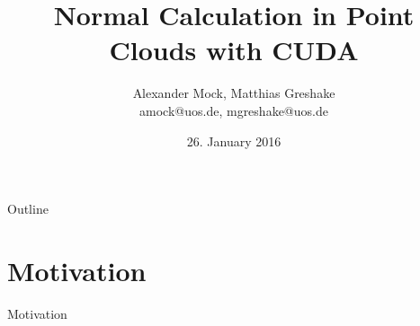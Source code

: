 \documentclass{beamer}
\begin{document}
\title{Normal Calculation in Point Clouds with CUDA}
\author[Matthias Greshake, Alexander Mock]{Alexander Mock, Matthias Greshake\\ {\scriptsize amock@uos.de, mgreshake@uos.de}}
\date{26. January 2016}

\begin{frame}[plain]
	\titlepage
\end{frame}

\begin{frame}{Outline}
	\tableofcontents
\end{frame}

\section{Motivation}

\begin{frame}{Motivation}
\end{frame}
\end{document}
